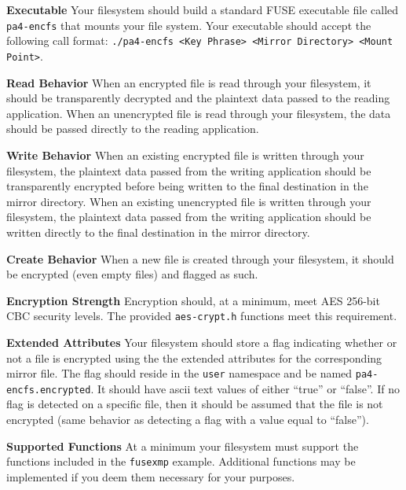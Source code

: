 \documentclass[12pt]{article}
\newenvironment{packed_item}{
\begin{itemize}
  \setlength{\itemsep}{1pt}
  \setlength{\parskip}{0pt}
  \setlength{\parsep}{0pt}
}{\end{itemize}}
\begin{document}
\begin{packed_item}
  \item {\bf Executable} Your filesystem should build a standard FUSE
    executable file called \texttt{pa4-encfs} that mounts your file
    system. Your executable should accept the following call format:
    \texttt{./pa4-encfs <Key Phrase> <Mirror Directory> <Mount Point>}.
  \item {\bf Read Behavior} When an encrypted file is read through your
    filesystem, it should be transparently decrypted and the plaintext
    data passed to the reading application. When an unencrypted file
    is read through your filesystem, the data should be passed directly
    to the reading application.
\item {\bf Write Behavior} When an existing encrypted file is written through your
    filesystem, the plaintext data passed from the writing application
    should be transparently encrypted before being written to the
    final destination in the mirror directory.
    When an existing unencrypted file
    is written through your filesystem, the plaintext data passed
    from the writing application should be written directly to the
    final destination in the mirror directory.
\item {\bf Create Behavior} When a new file is created through your
  filesystem, it should be encrypted (even empty files) and flagged as
  such.
\item {\bf Encryption Strength} Encryption should, at a minimum, meet
  AES 256-bit CBC security levels. The provided \texttt{aes-crypt.h}
  functions meet this requirement.
\item {\bf Extended Attributes} Your filesystem should store a flag
  indicating whether or not a file is encrypted using the the extended
  attributes for the corresponding mirror file. The flag should reside
  in the \texttt{user} namespace\cite{freedesktop-xattr} and be named
  \texttt{pa4-encfs.encrypted}. It should have ascii text values of either
  ``true'' or ``false''. If no flag is detected on a specific file,
  then it should be assumed that the file is not encrypted (same
  behavior as detecting a flag with a value equal to ``false'').
\item {\bf Supported Functions} At a minimum your filesystem must
  support the functions included in the \texttt{fusexmp}
  example. Additional functions may be implemented if you deem them
  necessary for your purposes.
\end{packed_item}
\end{document}
